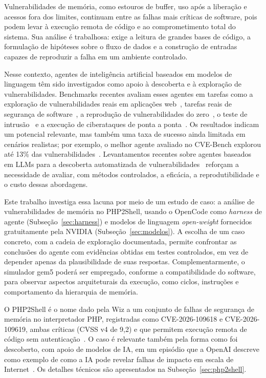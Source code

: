 \documentclass[12pt]{article}
\begin{document}
Vulnerabilidades de memória, como estouros de buffer, uso após a liberação e acessos fora dos limites, continuam entre as falhas mais críticas de software, pois podem levar à execução remota de código e ao comprometimento total do sistema. Sua análise é trabalhosa: exige a leitura de grandes bases de código, a formulação de hipóteses sobre o fluxo de dados e a construção de entradas capazes de reproduzir a falha em um ambiente controlado.

Nesse contexto, agentes de inteligência artificial baseados em modelos de linguagem têm sido investigados como apoio à descoberta e à exploração de vulnerabilidades. Benchmarks recentes avaliam esses agentes em tarefas como a exploração de vulnerabilidades reais em aplicações web~\cite{pmlr-v267-zhu25i}, tarefas reais de segurança de software~\cite{NEURIPS2025_a9168f1c}, a reprodução de vulnerabilidades do zero~\cite{he2026reprobenchbenchmarkingllmagents}, o teste de intrusão~\cite{gioacchini-etal-2025-autopenbench} e a execução de ciberataques de ponta a ponta~\cite{pmlr-v306-shi26r}. Os resultados indicam um potencial relevante, mas também uma taxa de sucesso ainda limitada em cenários realistas; por exemplo, o melhor agente avaliado no CVE-Bench explorou até 13\% das vulnerabilidades~\cite{pmlr-v267-zhu25i}. Levantamentos recentes sobre agentes baseados em LLMs para a descoberta automatizada de vulnerabilidades~\cite{11580353} reforçam a necessidade de avaliar, com métodos controlados, a eficácia, a reprodutibilidade e o custo dessas abordagens.

Este trabalho investiga essa lacuna por meio de um estudo de caso: a análise de vulnerabilidades de memória no PHP2Shell, usando o OpenCode como \textit{harness} de agente (Subseção~\ref{sec:harness}) e modelos de linguagem \textit{open-weight} fornecidos gratuitamente pela NVIDIA (Subseção~\ref{sec:modelos}). A escolha de um caso concreto, com a cadeia de exploração documentada, permite confrontar as conclusões do agente com evidências obtidas em testes controlados, em vez de depender apenas da plausibilidade de suas respostas. Complementarmente, o simulador gem5 poderá ser empregado, conforme a compatibilidade do software, para observar aspectos arquiteturais da execução, como ciclos, instruções e comportamento da hierarquia de memória.

O PHP2Shell é o nome dado pela Wiz a um conjunto de falhas de segurança de memória no interpretador PHP, registradas como CVE-2026-109618 e CVE-2026-109619, ambas críticas (CVSS v4 de 9,2) e que permitem execução remota de código sem autenticação~\cite{wiz2026php2shell,php2026ghsaw8hw,php2026ghsa6wmf}. O caso é relevante também pela forma como foi descoberto, com apoio de modelos de IA, em um episódio que a OpenAI descreve como exemplo de como a IA pode revelar falhas de impacto em escala de Internet~\cite{openai2026disclosure}. Os detalhes técnicos são apresentados na Subseção~\ref{sec:php2shell}.
\end{document}
